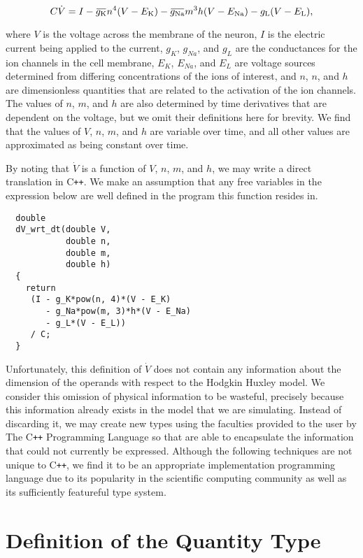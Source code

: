 \documentclass[reprint]{revtex4-1}
\newcommand{\overbar}[1]{\mkern 1.5mu\overline{\mkern-1.5mu#1\mkern-1.5mu}\mkern 1.5mu}
\begin{document}
\begin{equation*}
  C\dot{V} = I
  - \overbar{g_{\text{K}}}n^{4}(V - E_{\text{K}})
  - \overbar{g_{\text{Na}}}m^{3}h(V - E_{\text{Na}})
  - g_{\text{L}}(V - E_{\text{L}}),
\end{equation*}

where $V$ is the voltage across the membrane of the neuron, $I$ is the electric current being
applied to the current, $g_{K}$, $g_{Na}$, and $g_{L}$ are the conductances for the ion channels in the
cell membrane, $E_{K}$, $E_{Na}$, and $E_{L}$ are voltage sources determined from differing concentrations
of the ions of interest, and $n$, $n$, and $h$ are dimensionless quantities that are related to the activation
of the ion channels. The values of $n$, $m$, and $h$ are also determined by time derivatives that are dependent
on the voltage, but we omit their definitions here for brevity. We find that the values of $V$,
$n$, $m$, and $h$ are variable over time, and all other values are approximated as being constant over time.

By noting that $\dot{V}$ is a function of $V$, $n$, $m$, and $h$, we may write a direct translation in
C\verb!++!. We make an assumption that any free variables in the expression below are well defined in the program this
function resides in.

\begin{verbatim}
  double
  dV_wrt_dt(double V,
            double n,
            double m,
            double h)
  {
    return 
     (I - g_K*pow(n, 4)*(V - E_K)
        - g_Na*pow(m, 3)*h*(V - E_Na) 
        - g_L*(V - E_L))
     / C;
  }
\end{verbatim}

Unfortunately, this definition of $\dot{V}$ does not contain any information about the dimension
of the operands with respect to the Hodgkin Huxley model. We consider this omission of physical information to
be wasteful, precisely because this information already exists in the model that we are simulating.
Instead of discarding it, we may create new types using the faculties provided to the user by The C\verb!++!
Programming Language so that are able to encapsulate the information that could not currently be expressed.
Although the following techniques are not unique to C\verb!++!, we find it to be an appropriate implementation
programming language due to its popularity in the scientific computing community as well as its sufficiently
featureful type system.

\section{Definition of the Quantity Type}
\end{document}
